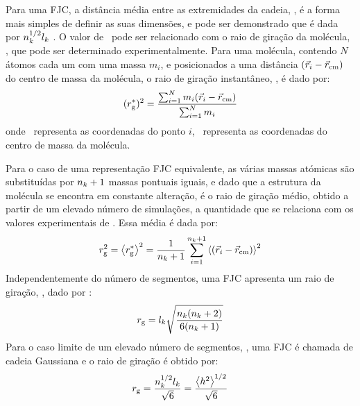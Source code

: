 Para uma FJC, a distância média entre as extremidades da cadeia, \distanciah, é a forma mais simples de definir as suas dimensões, e pode ser demonstrado que é dada por $n_{k}^{1/2}l_{k}$ \cite{teraoka,youngbook}. 
%
O valor de \distanciah\ pode ser relacionado com o raio de giração da molécula, \raiogiracao, que pode ser determinado experimentalmente. Para uma molécula, contendo $N$ átomos cada um com uma massa $m_{i}$, e posicionados a uma distância $(\vec{r}_{i}-\vec{r}_{\mathrm{cm}})$ do centro de massa da molécula, o raio de giração instantâneo, \raiogiracaoinst, é dado por:
%
%
%
\begin{equation}
(r_{\mathrm{g}}^{*})^{2}=\frac{\sum_{i=1}^{N} m_{i}(\vec{r}_{i}-\vec{r}_{\mathrm{cm}})}{\sum_{i=1}^{N} m_{i}} 
\end{equation}
onde \vectorpos\ representa as coordenadas do ponto $i$, \vectorcm\ representa as coordenadas do centro de massa da molécula.

Para o caso de uma representação FJC equivalente, as várias massas atómicas são substituídas por $n_{k}+1$ massas pontuais iguais, e dado que a estrutura da molécula se encontra em constante alteração, é o raio de giração médio, obtido a partir de um elevado número de simulações, a quantidade que se relaciona com os valores experimentais de \raiogiracao. Essa média é dada por:
%
\begin{equation}
r_{\mathrm{g}}^{2}=\left\langle r_{\mathrm{g}}^{*} \right\rangle ^{2} = \frac{1}{n_{k}+1}\sum_{i=1}^{n_{k}+1} \left\langle (\vec{r}_{i}-\vec{r}_{\mathrm{cm}})\right\rangle^{2} 
\end{equation}
Independentemente do número de segmentos, uma FJC apresenta um raio de giração, \raiogiracao, dado por \cite{teraoka}:
\begin{equation}
r_{\mathrm{g}}=l_{k}\sqrt{\frac{n_{k}(n_{k}+2)}{6(n_{k}+1)}}
\end{equation}
Para o caso limite de um elevado número de segmentos, \numsegmento, uma FJC é chamada de cadeia Gaussiana e o raio de giração é obtido por:
%
\begin{equation}
\label{eq:rgfjcco}
r_{\mathrm{g}}=\frac{n_{k}^{1/2}l_{k}}{\sqrt{6}}=\frac{\left\langle h^{2}\right\rangle^{1/2}}{\sqrt{6}}
\end{equation}

